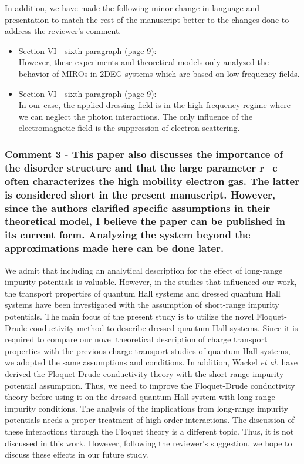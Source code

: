 \documentclass{article}
\begin{document}
In addition, we have made the following minor change in language and presentation to match the rest of the manuscript better to the changes done to address the reviewer’s comment.

\begin{itemize}
  \item Section VI - sixth paragraph (page 9):\\
  {\color{Red}
  However, these experiments and theoretical models only analyzed the behavior of MIROs in 2DEG systems which are based on low-frequency fields.
  }
  \item Section VI - sixth paragraph (page 9):\\
  {\color{Red} In our case, the applied dressing field is in the high-frequency regime where we can neglect the photon interactions. The only influence of the electromagnetic field is the suppression of electron scattering.}
\end{itemize}


\subsubsection*{Comment 3 -
\color{RoyalBlue} This paper also discusses the importance of the disorder structure and that the large parameter r\_c often characterizes the high mobility electron gas. The latter is considered short in the present manuscript. However, since the authors clarified specific assumptions in their theoretical model, I believe the paper can be published in its current form. Analyzing the system beyond the approximations made here can be done later.}

We admit that including an analytical description for the effect of long-range impurity potentials is valuable. However, in the studies \cite{dini16,endo09} that influenced our work, the transport properties of quantum Hall systems and dressed quantum Hall systems have been investigated with the assumption of short-range impurity potentials.
The main focus of the present study is to utilize the novel Floquet-Drude conductivity method \cite{wackerl20,wackerlthesis20} to describe dressed quantum Hall systems. Since it is required to compare our novel theoretical description of charge transport properties with the previous charge transport studies \cite{dini16,endo09} of quantum Hall systems, we adopted the same assumptions and conditions. In addition, Wackel \textit{et al.} \cite{wackerl20} have derived the Floquet-Drude conductivity theory with the short-range impurity potential assumption.  Thus, we need to improve the Floquet-Drude conductivity theory before using it on the dressed quantum Hall system with long-range impurity conditions. The analysis of the implications from long-range impurity potentials needs a proper treatment of high-order interactions.
The discussion of these interactions through the Floquet theory is a different topic. Thus, it is not discussed in this work. However, following the reviewer’s suggestion, we hope to discuss these effects in our future study.
\end{document}
